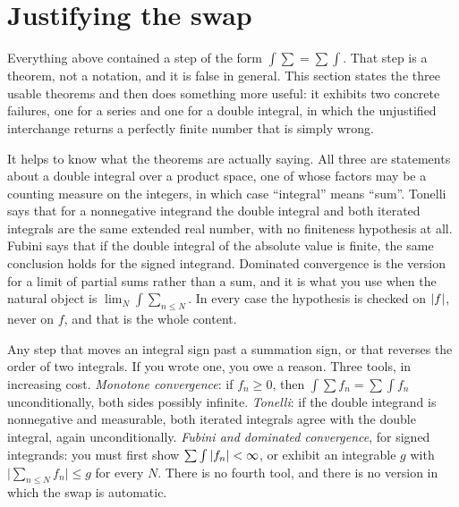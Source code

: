 \section{Justifying the swap}

Everything above contained a step of the form $\int\sum=\sum\int$. That step is a theorem, not a notation, and it is false in general. This section states the three usable theorems and then does something more useful: it exhibits two concrete failures, one for a series and one for a double integral, in which the unjustified interchange returns a perfectly finite number that is simply wrong.

It helps to know what the theorems are actually saying. All three are statements about a double integral over a product space, one of whose factors may be a counting measure on the integers, in which case ``integral'' means ``sum''. Tonelli says that for a nonnegative integrand the double integral and both iterated integrals are the same extended real number, with no finiteness hypothesis at all. Fubini says that if the double integral of the absolute value is finite, the same conclusion holds for the signed integrand. Dominated convergence is the version for a limit of partial sums rather than a sum, and it is what you use when the natural object is $\lim_N\int\sum_{n\leq N}$. In every case the hypothesis is checked on $\left\lvert f\right\rvert$, never on $f$, and that is the whole content.

\cue Any step that moves an integral sign past a summation sign, or that reverses the order of two integrals. If you wrote one, you owe a reason.
\method Three tools, in increasing cost. \emph{Monotone convergence}: if $f_n\geq0$, then $\int\sum f_n=\sum\int f_n$ unconditionally, both sides possibly infinite. \emph{Tonelli}: if the double integrand is nonnegative and measurable, both iterated integrals agree with the double integral, again unconditionally. \emph{Fubini and dominated convergence}, for signed integrands: you must first show $\sum\int\left\lvert f_n\right\rvert<\infty$, or exhibit an integrable $g$ with $\bigl\lvert\sum_{n\leq N}f_n\bigr\rvert\leq g$ for every $N$. There is no fourth tool, and there is no version in which the swap is automatic.

